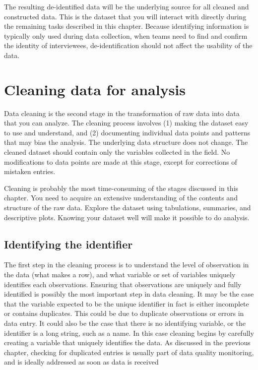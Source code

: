 The resulting de-identified data will be the underlying source for all cleaned and constructed data.
This is the dataset that you will interact with directly during the remaining tasks described in this chapter.
Because identifying information is typically only used during data collection,
when teams need to find and confirm the identity of interviewees,
de-identification should not affect the usability of the data.

\section{Cleaning data for analysis}

Data cleaning is the second stage in the transformation of raw data into data that you can analyze.
The cleaning process involves (1) making the dataset easy to use and understand,
and (2) documenting individual data points and patterns that may bias the analysis.
The underlying data structure does not change.
The cleaned dataset should contain only the variables collected in the field.
No modifications to data points are made at this stage, except for corrections of mistaken entries.

Cleaning is probably the most time-consuming of the stages discussed in this chapter.
You need to acquire an extensive understanding of the contents and structure of the raw data.
Explore the dataset using tabulations, summaries, and descriptive plots.
Knowing your dataset well will make it possible to do analysis.

\subsection{Identifying the identifier}

The first step in the cleaning process is to understand the level of observation in the data (what makes a row),
and what variable or set of variables uniquely identifies each observations.
Ensuring that observations are uniquely and fully identified
is possibly the most important step in data cleaning.
It may be the case that the variable expected to be the unique identifier in fact is either incomplete or contains duplicates.
This could be due to duplicate observations or errors in data entry.
It could also be the case that there is no identifying variable, or the identifier is a long string, such as a name.
In this case cleaning begins by carefully creating a variable that uniquely identifies the data.
As discussed in the previous chapter,
checking for duplicated entries is usually part of data quality monitoring,
and is ideally addressed as soon as data is received

